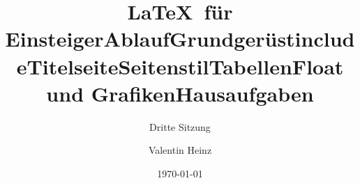 \documentclass[]{beamer}
\date{}
\author{Valentin Heinz}
\title{\LaTeX \ für Einsteiger}
\subtitle{Dritte Sitzung}
\date{\today}
\begin{document}
\maketitle

\title{Ablauf}


\title{Grundgerüst}


\title{include}


\title{Titelseite}


\title{Seitenstil}


\title{Tabellen}


\title{Float und Grafiken}


\title{Hausaufgaben}


\end{document}
